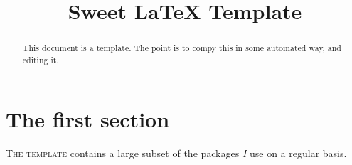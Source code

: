 \documentclass[11pt,twocolumn,letterpaper]{article}
\title{Sweet {\LaTeX} Template}
\begin{document}
\maketitle

\begin{abstract}
    This document is a template. The point is to compy this in some automated
    way, and editing it.
\end{abstract}

\section{The first section}
\lettrine{T}{he template} contains a large subset of the packages \textit{I}
use on a regular basis.
\end{document}
